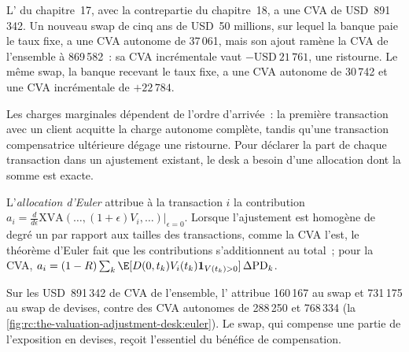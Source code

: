 \begin{example}\label{ex:rc:the-valuation-adjustment-desk:incremental}
L' du chapitre~17, avec la contrepartie du chapitre~18, a une CVA de USD~891\,342. Un nouveau
swap de cinq ans de USD~50 millions, sur lequel la banque paie le taux fixe, a une CVA autonome de 37\,061,
mais son ajout ramène la CVA de l'ensemble à 869\,582~: sa CVA incrémentale vaut $-\text{USD}~21\,761$, une
ristourne. Le même swap, la banque recevant le taux fixe, a une CVA autonome de 30\,742 et une
CVA incrémentale de $+22\,784$.
\end{example}

\label{lst:rc:the-valuation-adjustment-desk:euler}

Les charges marginales dépendent de l'ordre d'arrivée~: la première transaction avec un client acquitte la
charge autonome complète, tandis qu'une transaction compensatrice ultérieure dégage une ristourne. Pour déclarer la
part de chaque transaction dans un ajustement existant, le desk a besoin d'une allocation dont la somme est exacte.

\begin{definition}\label{def:rc:the-valuation-adjustment-desk:euler}
L'\emph{allocation d'Euler} attribue à la transaction $i$ la
contribution $a_i = \frac{d}{d\epsilon}\mathrm{XVA}(\ldots,(1+\epsilon)V_i,\ldots)|_{\epsilon=0}$. Lorsque l'ajustement est
homogène de degré un par rapport aux tailles des transactions, comme la CVA l'est, le théorème d'Euler fait que les
contributions s'additionnent au total~; pour la CVA,
$a_i = (1-R)\sum_k\E[D(0,t_k)V_i(t_k)\mathbf 1_{V(t_k)>0}]\,\Delta\mathrm{PD}_k$.
\end{definition}

\begin{example}\label{ex:rc:the-valuation-adjustment-desk:euler}
Sur les USD~891\,342 de CVA de l'ensemble, l' attribue 160\,167 au swap et 731\,175 au
swap de devises, contre des CVA autonomes de 288\,250 et 768\,334
(la \cref{fig:rc:the-valuation-adjustment-desk:euler}). Le swap, qui compense une partie de
l'exposition en devises, reçoit l'essentiel du bénéfice de compensation.
\end{example}

